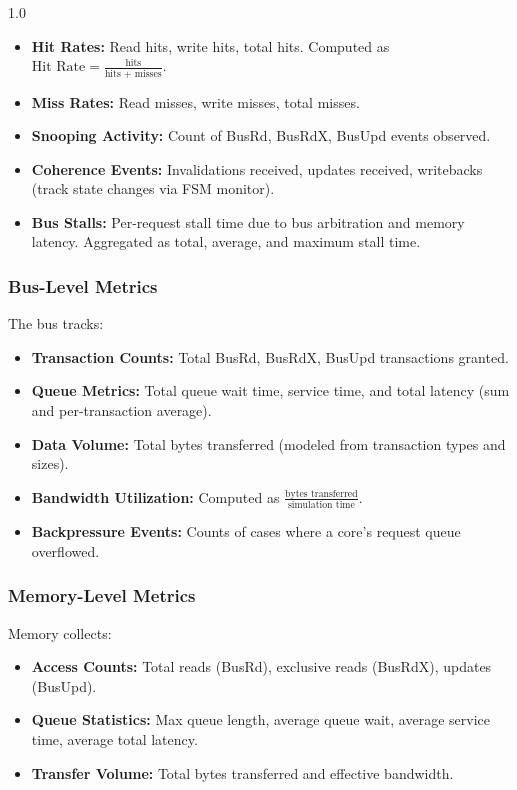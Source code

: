 \documentclass[12pt]{article}
\begin{document}
\begin{spacing}{1.0}
\begin{itemize}
    \item \textbf{Hit Rates:} Read hits, write hits, total hits. Computed as $\text{Hit Rate} = \frac{\text{hits}}{\text{hits + misses}}$.
    \item \textbf{Miss Rates:} Read misses, write misses, total misses.
    \item \textbf{Snooping Activity:} Count of BusRd, BusRdX, BusUpd events observed.
    \item \textbf{Coherence Events:} Invalidations received, updates received, writebacks (track state changes via FSM monitor).
    \item \textbf{Bus Stalls:} Per-request stall time due to bus arbitration and memory latency. Aggregated as total, average, and maximum stall time.
\end{itemize}

\subsubsection{Bus-Level Metrics}

The bus tracks:

\begin{itemize}
    \item \textbf{Transaction Counts:} Total BusRd, BusRdX, BusUpd transactions granted.
    \item \textbf{Queue Metrics:} Total queue wait time, service time, and total latency (sum and per-transaction average).
    \item \textbf{Data Volume:} Total bytes transferred (modeled from transaction types and sizes).
    \item \textbf{Bandwidth Utilization:} Computed as $\frac{\text{bytes transferred}}{\text{simulation time}}$.
    \item \textbf{Backpressure Events:} Counts of cases where a core's request queue overflowed.
\end{itemize}

\subsubsection{Memory-Level Metrics}

Memory collects:

\begin{itemize}
    \item \textbf{Access Counts:} Total reads (BusRd), exclusive reads (BusRdX), updates (BusUpd).
    \item \textbf{Queue Statistics:} Max queue length, average queue wait, average service time, average total latency.
    \item \textbf{Transfer Volume:} Total bytes transferred and effective bandwidth.
\end{itemize}


\end{spacing}
\end{document}
